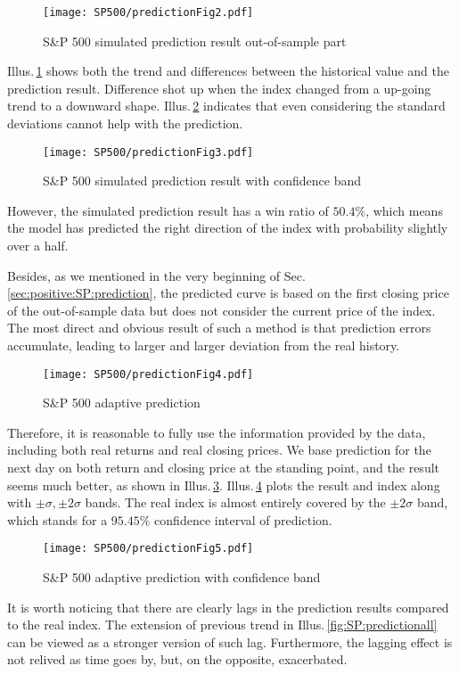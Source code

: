         \begin{figure}[!hbt]
        \center
        \texttt{[image: SP500/predictionFig2.pdf]}
        \caption{S\&P 500 simulated prediction result out-of-sample part}
        \label{fig:SP:predictionout}
        \end{figure}
Illus.\,\ref{fig:SP:predictionout} shows both the trend and differences 
between the historical value and the prediction result.
Difference shot up when the index changed from a up-going trend to a downward shape.
Illus.\,\ref{fig:SP:predictionstd} indicates that even considering the standard deviations 
cannot help with the prediction.

        \begin{figure}[!hbt]
        \center
        \texttt{[image: SP500/predictionFig3.pdf]}
        \caption{S\&P 500 simulated prediction result with confidence band}
        \label{fig:SP:predictionstd}
        \end{figure}
However, the simulated prediction result has a win ratio of $50.4\%$,
which means the model has predicted the right direction of the index 
with probability slightly over a half.

Besides, as we mentioned in the very beginning of Sec.\,\ref{sec:positive:SP:prediction},
the predicted curve is based on the first closing price of the out-of-sample data 
but does not consider the current price of the index.
The most direct and obvious result of such a method is that prediction errors accumulate,
leading to larger and larger deviation from the real history.

        \begin{figure}[!hbt]
        \center
        \texttt{[image: SP500/predictionFig4.pdf]}
        \caption{S\&P 500 adaptive prediction}
        \label{fig:SP:predictiondyn}
        \end{figure}
Therefore, it is reasonable to fully use the information provided by the data,
including both real returns and real closing prices.
We base prediction for the next day on both return and closing price at the standing point,
and the result seems much better, as shown in Illus.\,\ref{fig:SP:predictiondyn}.
Illus.\,\ref{fig:SP:predictiondynstd} plots the result and index along with 
$\pm \sigma, \pm 2\sigma$ bands.
The real index is almost entirely covered by the $\pm 2\sigma$ band,
which stands for a $95.45\%$ confidence interval of prediction.

        \begin{figure}[!hbt]
        \center
        \texttt{[image: SP500/predictionFig5.pdf]}
        \caption{S\&P 500 adaptive prediction with confidence band}
        \label{fig:SP:predictiondynstd}
        \end{figure}
It is worth noticing that there are clearly lags 
in the prediction results compared to the real index.
The extension of previous trend in Illus.\,\ref{fig:SP:predictionall} can be viewed
as a stronger version of such lag.
Furthermore, the lagging effect is not relived as time goes by,
but, on the opposite, exacerbated.

